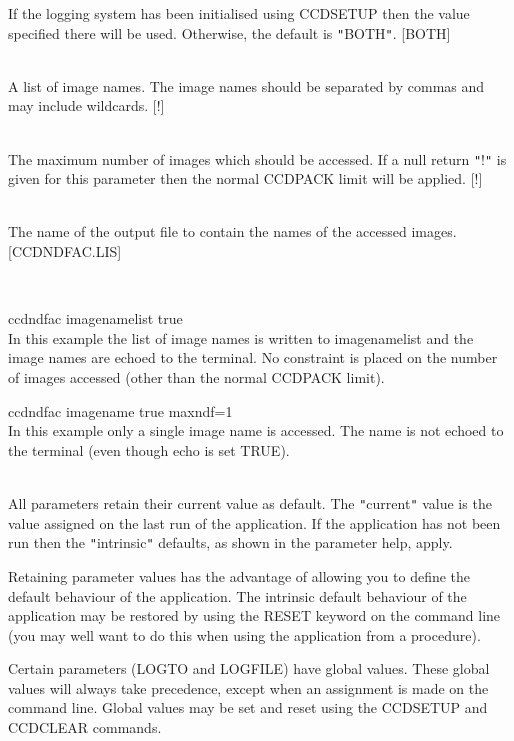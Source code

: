 \documentclass[twoside,11pt]{article}
\newcommand{\htmlref}[2]{#1}
\renewcommand{\_}{\texttt{\symbol{95}}}
\newcommand{\qt}[1]{{\tt "}#1{\tt "}}
\newcommand{\xroutine}[1]{\htmlref{{\sc #1}}{#1}}
\newcommand{\sstexamples}[1]{
   \item[Examples:] \mbox{} \\
   \vspace{-3.5ex}
   \begin{description}
      #1
   \end{description}
}
\newcommand{\sstsubsection}[1]{ \item[{#1}] \mbox{} \\}
\newcommand{\sstexamplesubsection}[2]{\sloppy \item{\ssttt #1} \mbox{} \\ #2 }
\newcommand{\sstdiytopic}[2]{\item[#1:] \mbox{} \\[1.3ex] #2}
\newcommand{\sstexamples}[1]{
      \item[Examples:] \\
      \begin{description}
         #1
      \end{description}
      \\
   }
\newcommand{\sstsubsection}[1]{\item[{#1}]}
\newcommand{\sstexamplesubsection}[2]{\item[{\ssttt #1}] #2}
\newcommand{\sstdiytopic}[2]{\item[{#1}] #2 }
\begin{document}
{{{{         }
         If the logging system has been initialised using \xroutine{CCDSETUP}
         then the value specified there will be used. Otherwise, the
         default is \qt{BOTH}.
         [BOTH]
      }
      \sstsubsection{
         IN = LITERAL (Read)
      } {
         A list of image names. The image names should be separated
         by commas and may include wildcards.
         [!]
      }
      \sstsubsection{
         MAXNDF = \_INTEGER (Read)
      } {
         The maximum number of images which should be accessed. If a null
         return \qt{!} is given for this parameter then the normal CCDPACK
         limit will be applied.
         [!]
      }
      \sstsubsection{
         NAMELIST = LITERAL (Read)
      } {
         The name of the output file to contain the names of the
         accessed images.
         [CCDNDFAC.LIS]
      }
   }
\newpage
   \sstexamples{
      \sstexamplesubsection{
         ccdndfac image\_name\_list true
      } {
         In this example the list of image names is written to
         image\_name\_list and the image names are echoed to the terminal. No
         constraint is placed on the number of images accessed (other than
         the normal CCDPACK limit).
      }
      \sstexamplesubsection{
         ccdndfac image\_name true maxndf=1
      } {
         In this example only a single image name is accessed. The name is
         not echoed to the terminal (even though echo is set TRUE).
      }
   }
   \sstdiytopic{
      Behaviour of parameters
   } {
      All parameters retain their current value as default. The
      \qt{current} value is the value assigned on the last run of the
      application. If the application has not been run then the
      \qt{intrinsic} defaults, as shown in the parameter help, apply.

      Retaining parameter values has the advantage of allowing you to
      define the default behaviour of the application. The intrinsic
      default behaviour of the application may be restored by using the
      RESET keyword on the command line (you may well want to do this
      when using the application from a procedure).

      Certain parameters (LOGTO and LOGFILE) have global values. These
      global values will always take precedence, except when an
      assignment is made on the command line. Global values may be set
      and reset using the \xroutine{CCDSETUP} and \xroutine{CCDCLEAR} commands.
   }
}
\end{document}
